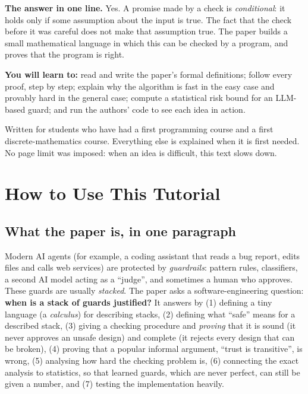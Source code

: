 \begin{titlepage}
\begin{center}
\begin{minipage}{0.86\textwidth}
\smallskip
\textbf{The answer in one line.} Yes. A promise made by a check is \emph{conditional}: it holds only if some assumption about the input is true. The fact that the check before it was careful does not make that assumption true. The paper builds a small mathematical language in which this can be checked by a program, and proves that the program is right.

\medskip
\textbf{You will learn to:} read and write the paper's formal definitions; follow every proof, step by step; explain why the algorithm is fast in the easy case and provably hard in the general case; compute a statistical risk bound for an LLM-based guard; and run the authors' code to see each idea in action.
\end{minipage}
\end{center}
\vfill
{\small\color{gray} Written for students who have had a first programming course and a first discrete-mathematics course. Everything else is explained when it is first needed. No page limit was imposed: when an idea is difficult, this text slows down.}
\end{titlepage}

\tableofcontents
\clearpage

\section*{How to Use This Tutorial}

\subsection*{What the paper is, in one paragraph}

Modern AI agents (for example, a coding assistant that reads a bug report, edits files and calls web services) are protected by \emph{guardrails}: pattern rules, classifiers, a second AI model acting as a ``judge'', and sometimes a human who approves. These guards are usually \emph{stacked}. The paper asks a software-engineering question: \textbf{when is a stack of guards justified?} It answers by (1) defining a tiny language (a \emph{calculus}) for describing stacks, (2) defining what ``safe'' means for a described stack, (3) giving a checking procedure and \emph{proving} that it is sound (it never approves an unsafe design) and complete (it rejects every design that can be broken), (4) proving that a popular informal argument, ``trust is transitive'', is wrong, (5) analysing how hard the checking problem is, (6) connecting the exact analysis to statistics, so that learned guards, which are never perfect, can still be given a number, and (7) testing the implementation heavily.

